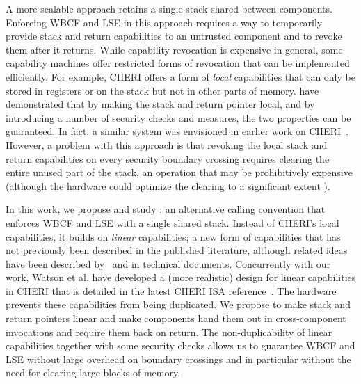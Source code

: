 \documentclass[acmsmall,screen]{acmart}\settopmatter{}
\begin{document}
A more scalable approach retains a single stack shared between components.
Enforcing WBCF and LSE in this approach requires a way to temporarily provide stack and return capabilities to an untrusted component and to revoke them after it returns.
While capability revocation is expensive in general, some capability machines offer restricted forms of revocation that can be implemented efficiently.
For example, CHERI offers a form of {\itshape local} capabilities that can only be stored in registers or on the stack but not in other parts of memory.
\citet{skorstengaard_reasoning_2017} have demonstrated that by making the stack and return pointer local, and by introducing a number of security checks and measures, the two properties can be guaranteed.
In fact, a similar system was envisioned in earlier work on CHERI~\citep{watson2012cheri}. 
However, a problem with this approach is that revoking the local stack and return capabilities on every security boundary crossing requires clearing the entire unused part of the stack, an operation that may be prohibitively expensive (although the hardware could optimize the clearing to a significant extent \citep{joannou_efficient_2017}).

In this work, we propose and study \stktokens{}: an alternative calling convention that enforces WBCF and LSE with a single shared stack.
Instead of CHERI's local capabilities, it builds on {\itshape linear} capabilities; a new form of capabilities that has not previously been described in the published literature, although related ideas have been described by~\citet[``scarce objects'']{szabo_formalizing_1997,szabo_scarce_objects} and in technical documents.
Concurrently with our work, Watson et al. have developed a (more realistic) design for linear capabilities in CHERI that is detailed in the latest CHERI ISA reference~\citep{watson2018ISA}.
The hardware prevents these capabilities from being duplicated.
We propose to make stack and return pointers linear and make components hand them out in cross-component invocations and require them back on return.
The non-duplicability of linear capabilities together with some security checks allows us to guarantee WBCF and LSE without large overhead on boundary crossings and in particular without the need for clearing large blocks of memory.
\end{document}

